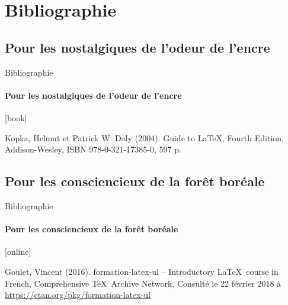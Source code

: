 
\section{Bibliographie}

\subsection{Pour les nostalgiques de l'odeur de l'encre}

\begin{frame}{Bibliographie}
	\framesubtitle{Pour les nostalgiques de l'odeur de l'encre}
	[book]
		
	\begin{thebibliography}{99}		
			Kopka, Helmut et Patrick W. Daly (2004).
			\newblock Guide to \LaTeX, Fourth Edition,
			\newblock Addison-Wesley,
			\newblock ISBN 978-0-321-17385-0, 597 p.		
	\end{thebibliography}

\end{frame}

\subsection{Pour les consciencieux de la forêt boréale}

\begin{frame}{Bibliographie}
	\framesubtitle{Pour les consciencieux de la forêt boréale}
	[online]
	
	\begin{thebibliography}{99}
		Goulet, Vincent (2016).
		\newblock formation-latex-ul -- Introductory \LaTeX\ course in French,
		\newblock Comprehensive \TeX\ Archive Network,
		\newblock Consulté le 22 février 2018 à \href{https://ctan.org/pkg/formation-latex-ul}{%
			https://ctan.org/pkg/formation-latex-ul}
	\end{thebibliography}
\end{frame}